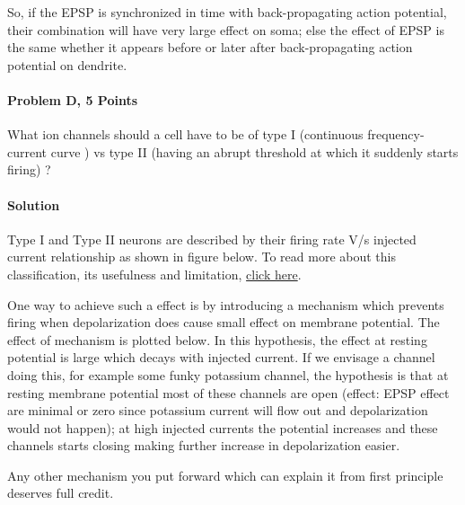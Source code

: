 \documentclass[a4paper,10pt]{article}
\begin{document}
So, if the EPSP is synchronized in time with back-propagating action potential,
their combination will have very large effect on soma; else the effect of EPSP
is the same whether it appears before or later after back-propagating action
potential on dendrite.

\paragraph{Problem D, 5 Points} What ion channels should a cell have to be of
type I (continuous frequency-current curve ) vs type II (having an abrupt
threshold at which it suddenly starts firing) ?

\paragraph{Solution} Type I and Type II neurons are described by their firing
rate V/s injected current relationship as shown in figure below. To read more
about this classification, its usefulness and limitation, 
\href{https://www.ncbi.nlm.nih.gov/pmc/articles/PMC3752709/}{click here}.


One way to achieve such a effect is by introducing a mechanism which prevents
firing when depolarization does cause small effect on membrane potential. The
effect of mechanism is plotted below. In this hypothesis, the effect at resting
potential is large which decays with injected current. If we envisage a channel
doing this, for example some funky potassium channel, the hypothesis is that at
resting membrane potential most of these channels are open (effect: EPSP effect
are minimal or zero since potassium current will flow out and depolarization
would not happen); at high injected currents the potential increases and these
channels starts closing making further increase in depolarization easier.



Any other mechanism you put forward which can explain it from first principle
deserves full credit.
\end{document}
